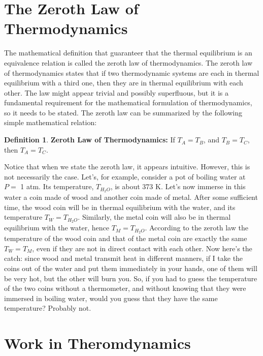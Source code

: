 \documentclass[
]{book}
\theoremstyle{definition}
\newtheorem{definition}{Definition}[chapter]
\theoremstyle{definition}
\theoremstyle{definition}
\theoremstyle{remark}
\begin{document}
\hypertarget{the-zeroth-law-of-thermodynamics}{%
\section{The Zeroth Law of Thermodynamics}\label{the-zeroth-law-of-thermodynamics}}

The mathematical definition that guaranteer that the thermal equilibrium is an equivalence relation is called the zeroth law of thermodynamics. The zeroth law of thermodynamics states that if two thermodynamic systems are each in thermal equilibrium with a third one, then they are in thermal equilibrium with each other. The law might appear trivial and possibly superfluous, but it is a fundamental requirement for the mathematical formulation of thermodynamics, so it needs to be stated. The zeroth law can be summarized by the following simple mathematical relation:

\begin{definition}
\protect\hypertarget{def:zerothlaw}{}{\label{def:zerothlaw} }\textbf{Zeroth Law of Thermodynamics:} If \(T_A = T_B\), and \(T_B = T_C\), then \(T_A = T_C\).
\end{definition}

Notice that when we state the zeroth law, it appears intuitive. However, this is not necessarily the case. Let's, for example, consider a pot of boiling water at \(P=\) 1 atm. Its temperature, \(T_{H_2O}\), is about 373 K. Let's now immerse in this water a coin made of wood and another coin made of metal. After some sufficient time, the wood coin will be in thermal equilibrium with the water, and its temperature \(T_W = T_{H_2O}\). Similarly, the metal coin will also be in thermal equilibrium with the water, hence \(T_M = T_{H_2O}\). According to the zeroth law the temperature of the wood coin and that of the metal coin are exactly the same \(T_W = T_M\), even if they are not in direct contact with each other. Now here's the catch: since wood and metal transmit heat in different manners, if I take the coins out of the water and put them immediately in your hands, one of them will be very hot, but the other will burn you. So, if you had to guess the temperature of the two coins without a thermometer, and without knowing that they were immersed in boiling water, would you guess that they have the same temperature? Probably not.

\hypertarget{workint}{%
\section{Work in Theromdynamics}\label{workint}}
\end{document}
